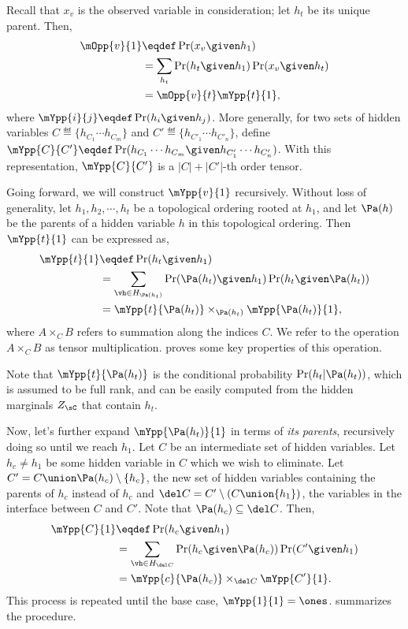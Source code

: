 Recall that $x_v$ is the observed variable in consideration; let $h_t$
be its unique parent. Then, 
\begin{align}
  \mOpp{v}{1} &\eqdef \Pr( x_v \given h_1 ) \nonumber \\
              &= \sum_{h_t}  \Pr( h_t \given h_1 ) \Pr( x_v \given h_t ) \nonumber\\
              &= \mOpp{v}{t} \mYpp{t}{1}, \label{eqn:expanding-O}
\end{align}
where $\mYpp{i}{j} \eqdef \Pr( h_i \given h_j )$. 
More generally, for two sets of hidden variables $C \eqdef \{h_{C_1}
\cdots h_{C_m} \}$ and $C' \eqdef \{h_{C'_1} \cdots h_{C'_n} \}$, 
define $\mYpp{C}{C'} \eqdef \Pr( h_{C_1} \cdots h_{C_m} \given h_{C'_1}
\cdots h_{C'_n} )$. 
With this representation, $\mYpp{C}{C'}$ is a $|C| + |C'|$-th order
tensor.
  
Going forward, we will construct $\mYpp{v}{1}$ recursively.
Without loss of generality, let $h_1, h_2, \cdots, h_t$ be a topological
  ordering rooted at $h_1$,
and let $\Pa(h)$ be the parents of a hidden variable $h$ in
  this topological ordering.
Then $\mYpp{t}{1}$ can be expressed as,
\begin{align*}
  \mYpp{t}{1} &\eqdef \Pr( h_t \given h_1 )  \\
  &= \sum_{\vh \in H_{\Pa(h_t)}} \Pr( \Pa(h_t) \given h_1 ) \Pr( h_t \given \Pa(h_t) ) \\
  &= \mYpp{t}{\Pa(h_t)} \times_{\Pa(h_t)} \mYpp{ \Pa(h_t) }{1},
\end{align*}
where $A \times_{C} B$ refers to summation along the indices $C$. We
refer to the operation $A \times_C B$ as tensor multiplication.
 proves some key properties of this
operation. 

Note that $\mYpp{t}{\Pa(h_t)}$ is the conditional probability $\Pr(h_t
 | \Pa(h_t))$, which is assumed to be full rank, and can be easily
 computed from the hidden marginals $Z_\sC$ that contain $h_t$. 

Now, let's further expand $\mYpp{ \Pa(h_t) }{1}$ in terms of {\em its
  parents}, recursively doing so until we reach $h_1$.
Let $C$ be an intermediate set of hidden variables. Let $h_c \neq h_1$
  be some hidden variable in $C$ which we wish to eliminate. 
Let $C' = C \union \Pa(h_c) \setminus \{h_c\}$, the new set of hidden
  variables containing the parents of $h_c$ instead of $h_c$ and $\del
  C = C' \setminus (C \union \{h_1\})$, the variables in the interface
  between $C$ and $C'$.
Note that $\Pa(h_c) \subseteq \del C$.
Then,
\begin{align}
  \mYpp{C}{1} &\eqdef \Pr( h_c \given h_1 ) \nonumber \\
  &= \sum_{\vh \in H_{\del C}} \Pr( h_c \given \Pa(h_c) ) \Pr( C' \given h_1 ) \nonumber \\
  &= \mYpp{c}{\Pa(h_c)}  \times_{\del C} \mYpp{ C' }{ 1 }. \label{eqn:recursive-step}
\end{align}
This process is repeated until the base case, $\mYpp{1}{1} = \ones$.
 summarizes the procedure.

